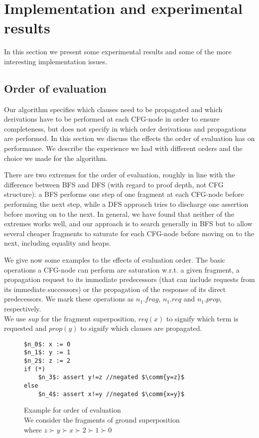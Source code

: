 \chapter{Implementation and experimental results}\label{chapter:implementation}
In this section we present some experimental results and some of the more interesting implementation issues.

\section{Order of evaluation}
Our algorithm specifies which clauses need to be propagated and which derivations have to be performed at each CFG-node in order to ensure completeness, but does not specify in which order derivations and propagations are performed.
In this section we discuss the effects the order of evaluation has on performance. 
We describe the experience we had with different orders and the choice we made for the algorithm.

There are two extremes for the order of evaluation, roughly in line with the difference between BFS and DFS (with regard to proof depth, not CFG structure): a BFS performs one step of one fragment at each CFG-node before performing the next step, while a DFS approach tries to discharge one assertion before moving on to the next. In general, we have found that neither of the extremes works well, and our approach is to search generally in BFS but to allow several cheaper fragments to saturate for each CFG-node before moving on to the next, including equality and heaps.

We give now some examples to the effects of evaluation order.
The basic operations a CFG-node can perform are saturation w.r.t. a given fragment, a propagation request to its immediate predecessors (that can include requests from its immediate successors) or the propagation of the response of its direct predecessors. We mark these operations as $n_1.frag$, $n_1.req$ and $n_1.prop$, respectively.\\
We use $sup$ for the fragment superposition, $req(x)$ to signify which term is requested and $prop(y)$ to signify which clauses are propagated. 

\begin{figure}
\begin{lstlisting}
$n_0$: x := 0
$n_1$: y := 1
$n_2$: z := 2
if (*)
	$n_3$: assert y!=z //negated $\comm{y=z}$
else
	$n_4$: assert x!=y //negated $\comm{x=y}$
\end{lstlisting}
\caption{Example for order of evaluation\\
We consider the fragments of ground superposition \\
where $z\succ y \succ x \succ 2 \succ 1 \succ 0$}
\label{snippet_7.1}
\end{figure}

